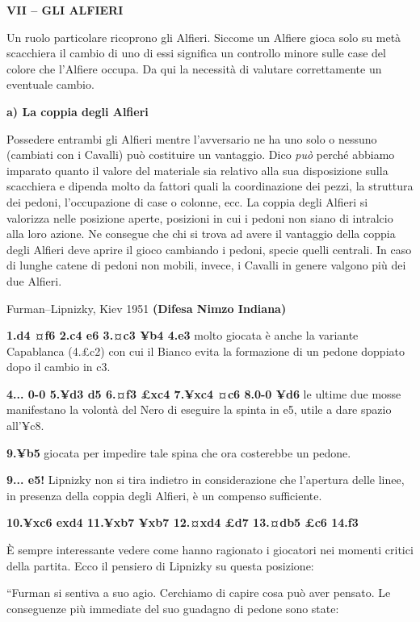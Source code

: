 \textbf{VII -- GLI ALFIERI}

Un ruolo particolare ricoprono gli Alfieri. Siccome un Alfiere gioca
solo su metà scacchiera il cambio di uno di essi significa un controllo
minore sulle case del colore che l'Alfiere occupa. Da qui la necessità
di valutare correttamente un eventuale cambio.

\textbf{a) La coppia degli Alfieri}

Possedere entrambi gli Alfieri mentre l'avversario ne ha uno solo o
nessuno (cambiati con i Cavalli) può costituire un vantaggio. Dico
\emph{può} perché abbiamo imparato quanto il valore del materiale sia
relativo alla sua disposizione sulla scacchiera e dipenda molto da
fattori quali la coordinazione dei pezzi, la struttura dei pedoni,
l'occupazione di case o colonne, ecc. La coppia degli Alfieri si
valorizza nelle posizione aperte, posizioni in cui i pedoni non siano di
intralcio alla loro azione. Ne consegue che chi si trova ad avere il
vantaggio della coppia degli Alfieri deve aprire il gioco cambiando i
pedoni, specie quelli centrali. In caso di lunghe catene di pedoni non
mobili, invece, i Cavalli in genere valgono più dei due Alfieri.

Furman--Lipnizky, Kiev 1951 \textbf{(Difesa Nimzo Indiana)}

\textbf{1.d4 ¤f6 2.c4 e6 3.¤c3 ¥b4 4.e3} molto giocata è anche la
variante Capablanca (4.£c2) con cui il Bianco evita la formazione di un
pedone doppiato dopo il cambio in c3.

\textbf{4... 0-0 5.¥d3 d5 6.¤f3 £xc4 7.¥xc4 ¤c6 8.0-0 ¥d6} le ultime due
mosse manifestano la volontà del Nero di eseguire la spinta in e5, utile
a dare spazio all'¥c8.

\textbf{9.¥b5} giocata per impedire tale spina che ora costerebbe un
pedone.

\textbf{9... e5!} Lipnizky non si tira indietro in considerazione che
l'apertura delle linee, in presenza della coppia degli Alfieri, è un
compenso sufficiente.

\textbf{10.¥xc6 exd4 11.¥xb7 ¥xb7 12.¤xd4 £d7 13.¤db5 £c6 14.f3}


È sempre interessante vedere come hanno ragionato i giocatori nei
momenti critici della partita. Ecco il pensiero di Lipnizky su questa
posizione:

``Furman si sentiva a suo agio. Cerchiamo di capire cosa può aver
pensato. Le conseguenze più immediate del suo guadagno di pedone sono
state:

